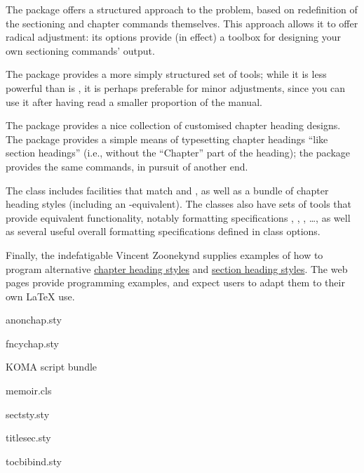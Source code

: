 The  package offers a structured approach to the
problem, based on redefinition of the sectioning and chapter commands
themselves.  This approach allows it to offer radical adjustment: its
options provide (in effect) a toolbox for designing your own
sectioning commands' output.

The  package provides a more simply structured set of
tools; while it is less powerful than is , it is
perhaps preferable for minor adjustments, since you can use it after
having read a smaller proportion of the manual.

The  package provides a nice collection of customised
chapter heading designs.  The  package provides a
simple means of typesetting chapter headings ``like section headings''
(i.e., without the ``Chapter'' part of the heading); the
 package provides the same commands, in pursuit of
another end.

The  class includes facilities that match
 and , as well as a bundle of
chapter heading styles (including an -equivalent).
The  classes also have sets of tools that provide
equivalent functionality, notably formatting specifications ,
, , \dots{}, as well as several
useful overall formatting specifications defined in class options.

Finally, the indefatigable Vincent Zoonekynd supplies examples of how
to program alternative %
\href{http://zoonek.free.fr/LaTeX/LaTeX_samples_chapter/0.html}{chapter heading styles}
and
\href{http://zoonek.free.fr/LaTeX/LaTeX_samples_section/0.html}{section heading styles}.
The web pages provide programming examples, and expect users to adapt
them to their own \LaTeX{} use.
\begin{ctanrefs}
\item[anonchap.sty]
\item[fncychap.sty]
\item[\nothtml{\rmfamily}KOMA script bundle]
\item[memoir.cls]
\item[sectsty.sty]
\item[titlesec.sty]
\item[tocbibind.sty]
\end{ctanrefs}

